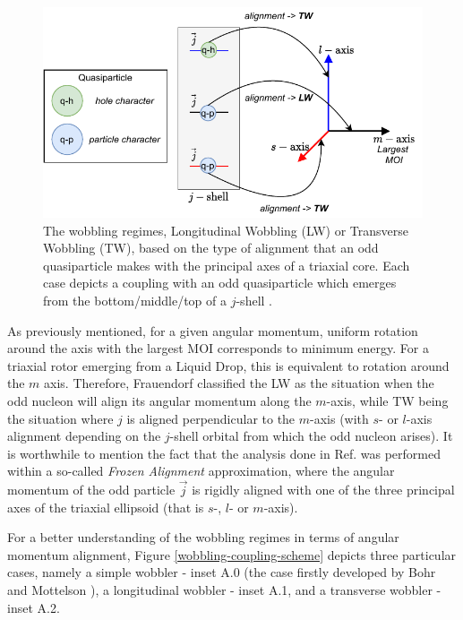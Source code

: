 \documentclass[11pt]{article}
\begin{document}
\begin{figure}
    \centering
    \includegraphics[scale=0.9]{figs/wobbling_Regimes_updated.pdf}
    \caption{The wobbling regimes, Longitudinal Wobbling (LW) or Transverse Wobbling (TW), based on the type of alignment that an odd quasiparticle makes with the principal axes of a triaxial core. Each case depicts a coupling with an odd quasiparticle which emerges from the bottom/middle/top of a $j$-shell \cite{frauendorf2014transverse}.}
    \label{quasiparticle-alignment}
\end{figure}

As previously mentioned, for a given angular momentum, uniform rotation around the axis with the largest MOI corresponds to minimum energy. For a triaxial rotor emerging from a Liquid Drop, this is equivalent to rotation around the $m$ axis. Therefore, Frauendorf \cite{frauendorf2014transverse} classified the LW as the situation when the odd nucleon will align its angular momentum along the $m$-axis, while TW being the situation where $j$ is aligned perpendicular to the $m$-axis (with $s$- or $l$-axis alignment depending on the $j$-shell orbital from which the odd nucleon arises). It is worthwhile to mention the fact that the analysis done in Ref. \cite{frauendorf2014transverse} was performed within a so-called \emph{Frozen Alignment} approximation, where the angular momentum of the odd particle $\vec{j}$ is rigidly aligned with one of the three principal axes of the triaxial ellipsoid (that is $s$-, $l$- or $m$-axis).

For a better understanding of the wobbling regimes in terms of angular momentum alignment, Figure \ref{wobbling-coupling-scheme} depicts three particular cases, namely a simple wobbler - inset A.0 (the case firstly developed by Bohr and Mottelson \cite{bohr1998nuclear}), a longitudinal wobbler - inset A.1, and a transverse wobbler - inset A.2.
\end{document}
